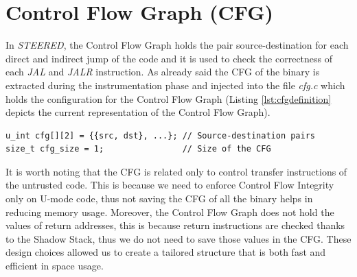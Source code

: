 \section{Control Flow Graph (CFG)}
\label{sec:project_cfg}

In \textit{STEERED}, the Control Flow Graph holds the pair source-destination
for each direct and indirect jump of the code and it is used to check the
correctness of each \textit{JAL} and \textit{JALR} instruction. As already said the
CFG of the binary is extracted during the instrumentation phase and injected into
the file \textit{cfg.c} which holds the configuration for the Control Flow Graph
(Listing \ref{lst:cfgdefinition} depicts the current representation of the Control
Flow Graph). \\ \begin{lstlisting}[style=CStyle, caption= Definition of the Control Flow Graph inside \textit{cfg.c}, label={lst:cfgdefinition}]
u_int cfg[][2] = {{src, dst}, ...}; // Source-destination pairs
size_t cfg_size = 1;                // Size of the CFG
\end{lstlisting}

It is worth noting that the CFG is related only to control transfer instructions
of the untrusted code. This is because we need to enforce Control Flow Integrity
only on U-mode code, thus not saving the CFG of all the binary helps in reducing
memory usage. Moreover, the Control Flow Graph does not hold the values of
return addresses, this is because return instructions are checked thanks to the Shadow
Stack, thus we do not need to save those values in the CFG. These design choices
allowed us to create a tailored structure that is both fast and efficient in space
usage.

